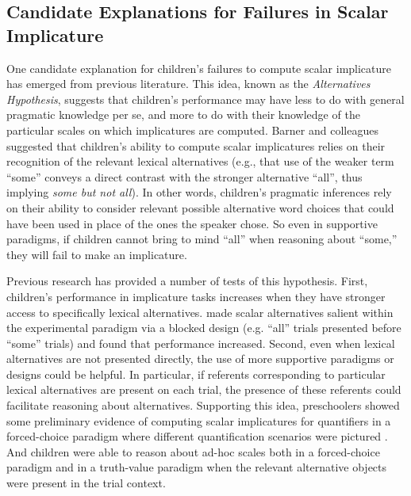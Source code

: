 \documentclass[man]{apa2}
\begin{document}
\subsection{Candidate Explanations for Failures in Scalar Implicature}

One candidate explanation for children's failures to compute scalar implicature has emerged from previous literature. This idea, known as the \emph{Alternatives Hypothesis}, suggests that children's performance may have less to do with general pragmatic knowledge per se, and more to do with their knowledge of the particular scales on which implicatures are computed. Barner and colleagues  suggested that children's ability to compute scalar implicatures relies on their recognition of the relevant lexical alternatives (e.g., that use of the weaker term ``some'' conveys a direct contrast with the stronger alternative ``all'', thus implying \emph{some but not all}).  In other words, children's pragmatic inferences rely on their ability to consider relevant possible alternative word choices that could have been used in place of the ones the speaker chose. So even in supportive paradigms, if children cannot bring to mind ``all'' when reasoning about ``some,'' they will fail to make an implicature.

Previous research has provided a number of tests of this hypothesis. First,  children's performance in implicature tasks increases when they have stronger access to specifically lexical alternatives.  made scalar alternatives salient within the experimental paradigm via a blocked design (e.g. ``all'' trials presented before ``some'' trials) and found that performance increased. Second, even when lexical alternatives are not presented directly, the use of more supportive paradigms or designs could be helpful. In particular, if referents corresponding to particular lexical alternatives are present on each trial, the presence of these referents could facilitate reasoning about alternatives. Supporting this idea, preschoolers showed some preliminary evidence of computing scalar implicatures for quantifiers in a forced-choice paradigm where different quantification scenarios were pictured . And children were able to reason about ad-hoc scales both in a forced-choice paradigm  and in a truth-value paradigm  when the relevant alternative objects were present in the trial context.
\end{document}
